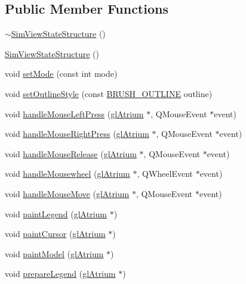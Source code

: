\subsection*{Public Member Functions}
\begin{DoxyCompactItemize}
\item 
\hyperlink{class_sim_view_state_structure_a9828433887b48e5c9970e722a2e6506d}{$\sim$\+Sim\+View\+State\+Structure} ()
\item 
\hyperlink{class_sim_view_state_structure_a40b328e72b5dfc6bcb74176a868d9932}{Sim\+View\+State\+Structure} ()
\item 
void \hyperlink{class_sim_view_state_structure_a3a90f8f41ff1383ca27d4b7684990979}{set\+Mode} (const int mode)
\item 
void \hyperlink{class_sim_view_state_structure_a058bfe5e7626fff59c1a329be9703283}{set\+Outline\+Style} (const \hyperlink{_sim_view_state_8h_a64cb6e33858a4b9db209712bab2f0e99}{B\+R\+U\+S\+H\+\_\+\+O\+U\+T\+L\+I\+N\+E} outline)
\item 
void \hyperlink{class_sim_view_state_structure_ae248744063ada5daf9e6d2eef9025948}{handle\+Mouse\+Left\+Press} (\hyperlink{classgl_atrium}{gl\+Atrium} $\ast$, Q\+Mouse\+Event $\ast$event)
\item 
void \hyperlink{class_sim_view_state_structure_a7a4160dd1a5f88e016baebc22b88e784}{handle\+Mouse\+Right\+Press} (\hyperlink{classgl_atrium}{gl\+Atrium} $\ast$, Q\+Mouse\+Event $\ast$event)
\item 
void \hyperlink{class_sim_view_state_structure_abb8f738ef86bd47034e309be7024c9d3}{handle\+Mouse\+Release} (\hyperlink{classgl_atrium}{gl\+Atrium} $\ast$, Q\+Mouse\+Event $\ast$event)
\item 
void \hyperlink{class_sim_view_state_structure_a7bfa48da0a9cdccb8fa2ec06dda602ba}{handle\+Mousewheel} (\hyperlink{classgl_atrium}{gl\+Atrium} $\ast$, Q\+Wheel\+Event $\ast$event)
\item 
void \hyperlink{class_sim_view_state_structure_a0dec438e97fd54e39f057d7d641292a5}{handle\+Mouse\+Move} (\hyperlink{classgl_atrium}{gl\+Atrium} $\ast$, Q\+Mouse\+Event $\ast$event)
\item 
void \hyperlink{class_sim_view_state_structure_a6fa028f33f534b5bb311fa1640f491c4}{paint\+Legend} (\hyperlink{classgl_atrium}{gl\+Atrium} $\ast$)
\item 
void \hyperlink{class_sim_view_state_structure_adbea3b6c2714744bc0eebcd452bed40b}{paint\+Cursor} (\hyperlink{classgl_atrium}{gl\+Atrium} $\ast$)
\item 
void \hyperlink{class_sim_view_state_structure_a96d5263397b53a2639e1cc7b8b6b2c46}{paint\+Model} (\hyperlink{classgl_atrium}{gl\+Atrium} $\ast$)
\item 
void \hyperlink{class_sim_view_state_structure_ad2d4accdf29279f0feaf94dc99824862}{prepare\+Legend} (\hyperlink{classgl_atrium}{gl\+Atrium} $\ast$)
\end{DoxyCompactItemize}

